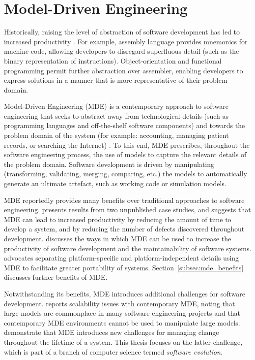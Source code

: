 
\section{Model-Driven Engineering}
Historically, raising the level of abstraction of software development has led to increased productivity \cite{brooks86nosilverbullet,boehm06view,kelly08dsm}. For example, assembly language provides mnemonics for machine code, allowing developers to disregard superfluous detail (such as the binary representation of instructions). Object-orientation and functional programming permit further abstraction over assembler, enabling developers to express solutions in a manner that is more representative of their problem domain.

Model-Driven Engineering (MDE) is a contemporary approach to software engineering that seeks to abstract away from technological details (such as programming languages and off-the-shelf software components) and towards the problem domain of the system (for example: accounting, managing patient records, or searching the Internet) \cite{frankel02mda,kleppe03mda,selic03pragmatics}. To this end, MDE prescribes, throughout the software engineering process, the use of models to capture the relevant details of the problem domain. Software development is driven by manipulating (transforming, validating, merging, comparing, etc.) the models to automatically generate an ultimate artefact, such as working code or simulation models.

MDE reportedly provides many benefits over traditional approaches to software engineering. \cite{watson08mdahistory} presents results from two unpublished case studies, and suggests that MDE can lead to increased productivity by reducing the amount of time to develop a system, and by reducing the number of defects discovered throughout development. \cite{kleppe03mda} discusses the ways in which MDE can be used to increase the productivity of software development and the maintainability of software systems. \cite{frankel02mda} advocates separating platform-specific and platform-independent details using MDE to facilitate greater portability of systems. Section~\ref{subsec:mde_benefits} discusses further benefits of MDE. 

Notwithstanding its benefits, MDE introduces additional challenges for software development. \cite{kolovos08scalability} reports scalability issues with contemporary MDE, noting that large models are commonplace in many software engineering projects and that contemporary MDE environments cannot be used to manipulate large models. \cite{Mens07} demonstrate that MDE introduces new challenges for managing change throughout the lifetime of a system. This thesis focuses on the latter challenge, which is part of a branch of computer science termed \emph{software evolution}.

